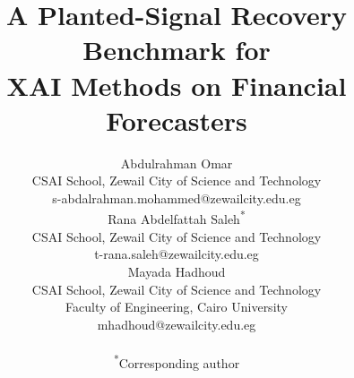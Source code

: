\documentclass[conference]{IEEEtran}
\begin{document}
\title{A Planted-Signal Recovery Benchmark for\\ XAI Methods on Financial Forecasters}

\author{%
\begin{minipage}[t]{0.33\textwidth}\centering
{\normalsize Abdulrahman Omar}\\[3pt]
{\footnotesize CSAI School, Zewail City of Science and Technology}\\
{\footnotesize s-abdalrahman.mohammed@zewailcity.edu.eg}
\end{minipage}%
\hfill
\begin{minipage}[t]{0.33\textwidth}\centering
{\normalsize Rana Abdelfattah Saleh\textsuperscript{*}}\\[3pt]
{\footnotesize CSAI School, Zewail City of Science and Technology}\\
{\footnotesize t-rana.saleh@zewailcity.edu.eg}
\end{minipage}%
\hfill
\begin{minipage}[t]{0.33\textwidth}\centering
{\normalsize Mayada Hadhoud}\\[3pt]
{\footnotesize CSAI School, Zewail City of Science and Technology}\\
{\footnotesize Faculty of Engineering, Cairo University}\\
{\footnotesize mhadhoud@zewailcity.edu.eg}
\end{minipage}\\[8pt]
{\footnotesize \textsuperscript{*}Corresponding author}%
}

\maketitle
\end{document}

